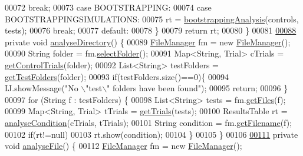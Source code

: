 \begin{DoxyCode}
00072         \textcolor{keywordflow}{break};
00073       \textcolor{keywordflow}{case} BOOTSTRAPPING:
00074       \textcolor{keywordflow}{case} BOOTSTRAPPINGSIMULATIONS:
00075         rt = \hyperlink{classanalysis_1_1_chemotaxis_a381aa5dd2dd75a72b6b21f7b2475d888}{bootstrappingAnalysis}(controls, tests);
00076         \textcolor{keywordflow}{break};
00077       \textcolor{keywordflow}{default}:
00078     \}
00079     \textcolor{keywordflow}{return} rt;
00080   \}
00081 
\hypertarget{_chemotaxis_8java_source_l00088}{}\hyperlink{classanalysis_1_1_chemotaxis_ad8447fb7554f7f126822c7a3f3f680ce}{00088}   \textcolor{keyword}{private} \textcolor{keywordtype}{void} \hyperlink{classanalysis_1_1_chemotaxis_ad8447fb7554f7f126822c7a3f3f680ce}{analyseDirectory}() \{
00089     \hyperlink{classfunctions_1_1_file_manager}{FileManager} fm = \textcolor{keyword}{new} \hyperlink{classfunctions_1_1_file_manager}{FileManager}();
00090     String folder = fm.\hyperlink{classfunctions_1_1_file_manager_af19fd6734ccb746c4f276c83b6a47689}{selectFolder}();
00091     Map<String, Trial> cTrials = \hyperlink{classanalysis_1_1_chemotaxis_a00ea60f92f2e11a363c01d04b6df7f10}{getControlTrials}(folder);
00092     List<String> testFolders = \hyperlink{classanalysis_1_1_chemotaxis_a973011dfbed998ea23443c2b79ac9ee3}{getTestFolders}(folder);
00093     \textcolor{keywordflow}{if}(testFolders.size()==0)\{
00094       IJ.showMessage(\textcolor{stringliteral}{"No \(\backslash\)"test\(\backslash\)" folders have been found"});
00095       \textcolor{keywordflow}{return};
00096     \}
00097     \textcolor{keywordflow}{for} (String f : testFolders) \{
00098       List<String> tests = fm.\hyperlink{classfunctions_1_1_file_manager_a3a54a5574abfddd928b2b8675e8affa6}{getFiles}(f);
00099       Map<String, Trial> tTrials = \hyperlink{classanalysis_1_1_chemotaxis_a5580224f7f7e9df7d925ad14f9364d98}{getTrials}(tests);
00100       ResultsTable rt = \hyperlink{classanalysis_1_1_chemotaxis_aaa89eb018d311df9e98b904088d282a5}{analyseCondition}(cTrials, tTrials);
00101       String condition = fm.\hyperlink{classfunctions_1_1_file_manager_ad027758f34214960a7aa800e0f7c19db}{getFilename}(f);
00102       \textcolor{keywordflow}{if}(rt!=null)
00103         rt.show(condition);
00104     \}
00105   \}
00106 
\hypertarget{_chemotaxis_8java_source_l00111}{}\hyperlink{classanalysis_1_1_chemotaxis_a0b1464e818c4300782cb7e3322448f95}{00111}   \textcolor{keyword}{private} \textcolor{keywordtype}{void} \hyperlink{classanalysis_1_1_chemotaxis_a0b1464e818c4300782cb7e3322448f95}{analyseFile}() \{
00112     \hyperlink{classfunctions_1_1_file_manager}{FileManager} fm = \textcolor{keyword}{new} \hyperlink{classfunctions_1_1_file_manager}{FileManager}();

\end{DoxyCode}
